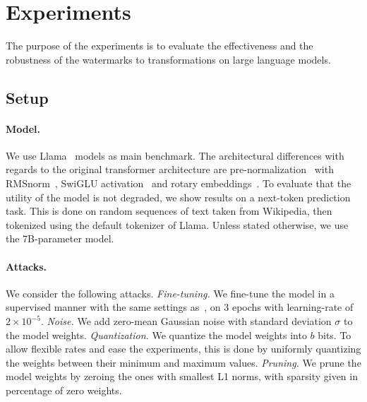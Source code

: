 \newcommand{\valtab}[1]{{\color{gray}\footnotesize ({#1})}}

\section{Experiments}\label{chap7/sec:experiments}

The purpose of the experiments is to evaluate the effectiveness and the robustness of the watermarks to transformations on large language models.

\subsection{Setup}

\paragraph*{Model.}
We use Llama~\citep{touvron2023llama} models as main benchmark. 
The architectural differences with regards to the original transformer architecture are pre-normali\-zation~\citep{radford2019language} with RMSnorm~\citep{zhang2019root}, SwiGLU activation~\citep{shazeer2020glu} and rotary embeddings~\citep{su2021roformer}.
To evaluate that the utility of the model is not degraded, we show results on a next-token prediction task.
This is done on random sequences of text taken from Wikipedia, then tokenized using the default tokenizer of Llama.
Unless stated otherwise, we use the $7$B-parameter model.

\paragraph*{Attacks.}
We consider the following attacks.
\emph{Fine-tuning.} 
We fine-tune the model in a supervised manner with the same settings as~\citep{alpaca}, on 3 epochs with learning-rate of $2\times 10^{-5}$.
\emph{Noise.} 
We add zero-mean Gaussian noise with standard deviation $\sigma$ to the model weights.
\emph{Quantization.}
We quantize the model weights into $b$ bits. 
To allow flexible rates and ease the experiments, this is done by uniformly quantizing the weights between their minimum and maximum values.
\emph{Pruning.}
We prune the model weights by zeroing the ones with smallest L1 norms, with sparsity given in percentage of zero weights.

